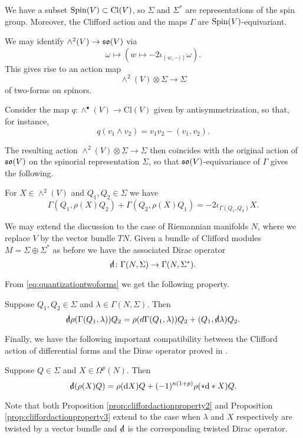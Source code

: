 \documentclass[10pt, oneside]{article}
\newcommand{\Cl}{\mathrm{Cl}}
\begin{document}
We have a subset $\Spin(V)\subset \Cl(V)$, so $\Sigma$ and $\Sigma^*$ are representations of the spin group. Moreover, the Clifford action and the maps $\Gamma$ are $\mathrm{Spin}(V)$-equivariant.

We may identify $\wedge^2(V)\rightarrow \mathfrak{so}(V)$ via
\[\omega\mapsto (w\mapsto -2\iota_{(w, -\rangle)} \omega).\]
This gives rise to an action map
\[\wedge^2(V)\otimes \Sigma\longrightarrow \Sigma\]
of two-forms on spinors.

Consider the map $q\colon \wedge^\bullet(V)\rightarrow \Cl(V)$ given by antisymmetrization, so that, for instance,
\begin{equation}
q(v_1\wedge v_2) = v_1v_2 - (v_1, v_2).
\label{eq:quantizationtwoforms}
\end{equation}

The resulting action $\wedge^2(V)\otimes \Sigma\rightarrow \Sigma$ then coincides with the original action of $\mathfrak{so}(V)$ on the spinorial representation $\Sigma$, so that $\mathfrak{so}(V)$-equivariance of $\Gamma$ gives the following.

\begin{prop}
For $X\in\wedge^2(V)$ and $Q_1,Q_2\in\Sigma$ we have
\[\Gamma(Q_1, \rho(X) Q_2) + \Gamma(Q_2, \rho(X) Q_1) = -2\iota_{\Gamma(Q_1, Q_2)} X.\]
\label{prop:cliffordactionproperty1}
\end{prop}

We may extend the discussion to the case of Riemannian manifolds $N$, where we replace $V$ by the vector bundle $TN$. Given a bundle of Clifford modules $M=\Sigma\oplus \Sigma^*$ as before we have the associated Dirac operator
\[\sd{\d}\colon \Gamma(N, \Sigma)\rightarrow \Gamma(N, \Sigma^*).\]

From \eqref{eq:quantizationtwoforms} we get the following property.

\begin{prop}
Suppose $Q_1,Q_2\in\Sigma$ and $\lambda\in\Gamma(N, \Sigma)$. Then
\[\sd{\d}\rho(\Gamma(Q_1, \lambda)) Q_2 = \rho(d \Gamma(Q_1, \lambda)) Q_2 + (Q_1, \sd{\d} \lambda) Q_2.\]
\label{prop:cliffordactionproperty2}
\end{prop}

Finally, we have the following important compatibility between the Clifford action of differential forms and the Dirac operator proved in \cite[equation 7.6]{Snygg}.

\begin{prop}
Suppose $Q\in\Sigma$ and $X\in\Omega^p(N)$. Then
\[\sd{\d}(\rho(X) Q) = \rho(\d X)Q + (-1)^{n(1+p)}\rho(\ast \d\ast X) Q.\]
\label{prop:cliffordactionproperty3}
\end{prop}

Note that both Proposition \ref{prop:cliffordactionproperty2} and Proposition \ref{prop:cliffordactionproperty3} extend to the case when $\lambda$ and $X$ respectively are twisted by a vector bundle and $\sd{\d}$ is the corresponding twisted Dirac operator.

\pagestyle{bib}
\printbibliography
\end{document}
